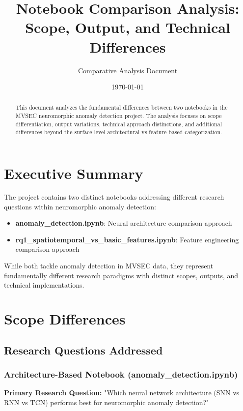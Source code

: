 \documentclass[11pt,a4paper]{article}
\title{Notebook Comparison Analysis: Scope, Output, and Technical Differences}
\author{Comparative Analysis Document}
\date{\today}
\begin{document}
\maketitle

\begin{abstract}
This document analyzes the fundamental differences between two notebooks in the MVSEC neuromorphic anomaly detection project. The analysis focuses on scope differentiation, output variations, technical approach distinctions, and additional differences beyond the surface-level architectural vs feature-based categorization.
\end{abstract}

\tableofcontents
\newpage

\section{Executive Summary}

The project contains two distinct notebooks addressing different research questions within neuromorphic anomaly detection:

\begin{itemize}
    \item \textbf{anomaly\_detection.ipynb}: Neural architecture comparison approach
    \item \textbf{rq1\_spatiotemporal\_vs\_basic\_features.ipynb}: Feature engineering comparison approach
\end{itemize}

While both tackle anomaly detection in MVSEC data, they represent fundamentally different research paradigms with distinct scopes, outputs, and technical implementations.

\section{Scope Differences}

\subsection{Research Questions Addressed}

\subsubsection{Architecture-Based Notebook (anomaly\_detection.ipynb)}
\textbf{Primary Research Question:} "Which neural network architecture (SNN vs RNN vs TCN) performs best for neuromorphic anomaly detection?"
\end{document}
